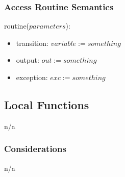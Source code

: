 \documentclass[12pt]{article}
\begin{document}
\subsubsection* {Access Routine Semantics}
\noindent routine($parameters$):
\begin{itemize}
    \item transition: $variable := something$
    \item output: $out := something$
    \item exception: $exc := something$
\end{itemize}


\subsection*{Local Functions}
n/a


\subsubsection* {Considerations}
n/a
\end{document}
